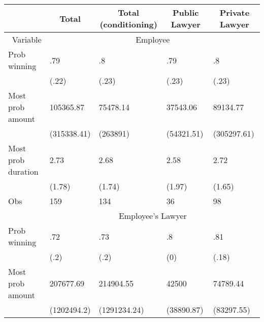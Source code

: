 \begin{tabular}{rrrrr}
\toprule
      & \multicolumn{1}{c}{Total} & \multicolumn{1}{c}{Total (conditioning)} & \multicolumn{1}{c}{Public Lawyer} & \multicolumn{1}{c}{Private Lawyer} \\
\midrule
Variable & \multicolumn{4}{c}{Employee} \\
\midrule
\midrule
\multicolumn{1}{l}{Prob winning} & \multicolumn{1}{l}{.79} & \multicolumn{1}{l}{.8} & \multicolumn{1}{l}{.79} & \multicolumn{1}{l}{.8} \\
\multicolumn{1}{l}{} & \multicolumn{1}{l}{(.22)} & \multicolumn{1}{l}{(.23)} & \multicolumn{1}{l}{(.23)} & \multicolumn{1}{l}{(.23)} \\
\multicolumn{1}{l}{Most prob amount} & \multicolumn{1}{l}{105365.87} & \multicolumn{1}{l}{75478.14} & \multicolumn{1}{l}{37543.06} & \multicolumn{1}{l}{89134.77} \\
\multicolumn{1}{l}{} & \multicolumn{1}{l}{(315338.41)} & \multicolumn{1}{l}{(263891)} & \multicolumn{1}{l}{(54321.51)} & \multicolumn{1}{l}{(305297.61)} \\
\multicolumn{1}{l}{Most prob duration} & \multicolumn{1}{l}{2.73} & \multicolumn{1}{l}{2.68} & \multicolumn{1}{l}{2.58} & \multicolumn{1}{l}{2.72} \\
\multicolumn{1}{l}{} & \multicolumn{1}{l}{(1.78)} & \multicolumn{1}{l}{(1.74)} & \multicolumn{1}{l}{(1.97)} & \multicolumn{1}{l}{(1.65)} \\
\multicolumn{1}{l}{Obs} & \multicolumn{1}{l}{159} & \multicolumn{1}{l}{134} & \multicolumn{1}{l}{36} & \multicolumn{1}{l}{98} \\
\midrule
\multicolumn{1}{l}{} & \multicolumn{4}{c}{Employee's Lawyer} \\
\midrule
\midrule
\multicolumn{1}{l}{Prob winning} & \multicolumn{1}{l}{.72} & \multicolumn{1}{l}{.73} & \multicolumn{1}{l}{.8} & \multicolumn{1}{l}{.81} \\
\multicolumn{1}{l}{} & \multicolumn{1}{l}{(.2)} & \multicolumn{1}{l}{(.2)} & \multicolumn{1}{l}{(0)} & \multicolumn{1}{l}{(.18)} \\
\multicolumn{1}{l}{Most prob amount} & \multicolumn{1}{l}{207677.69} & \multicolumn{1}{l}{214904.55} & \multicolumn{1}{l}{42500} & \multicolumn{1}{l}{74789.44} \\
\multicolumn{1}{l}{} & \multicolumn{1}{l}{(1202494.2)} & \multicolumn{1}{l}{(1291234.24)} & \multicolumn{1}{l}{(38890.87)} & \multicolumn{1}{l}{(83297.55)} \\

\end{tabular}
